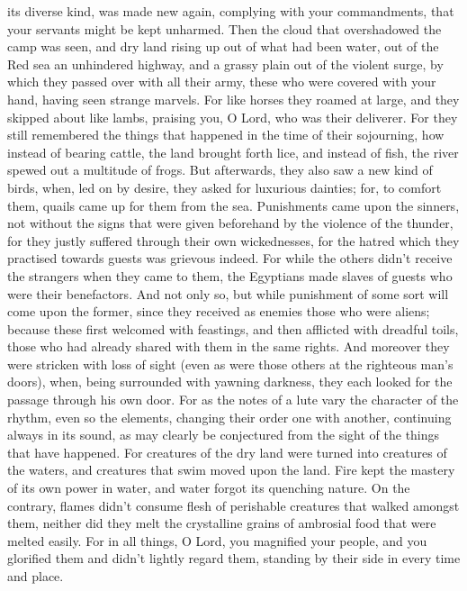 its diverse kind, was made new again, complying with your commandments,
that your servants might be kept unharmed.  Then the cloud
that overshadowed the camp was seen, and dry land rising up out of what
had been water, out of the Red sea an unhindered highway, and a grassy
plain out of the violent surge,  by which they passed over
with all their army, these who were covered with your hand, having seen
strange marvels.  For like horses they roamed at large, and
they skipped about like lambs, praising you, O Lord, who was their
deliverer.  For they still remembered the things that
happened in the time of their sojourning, how instead of bearing cattle,
the land brought forth lice, and instead of fish, the river spewed out a
multitude of frogs.  But afterwards, they also saw a new
kind of birds, when, led on by desire, they asked for luxurious
dainties;  for, to comfort them, quails came up for them
from the sea.  Punishments came upon the sinners, not
without the signs that were given beforehand by the violence of the
thunder, for they justly suffered through their own wickednesses, for
the hatred which they practised towards guests was grievous indeed.
 For while the others didn't receive the strangers when
they came to them, the Egyptians made slaves of guests who were their
benefactors.  And not only so, but while punishment of some
sort will come upon the former, since they received as enemies those who
were aliens;  because these first welcomed with feastings,
and then afflicted with dreadful toils, those who had already shared
with them in the same rights.  And moreover they were
stricken with loss of sight (even as were those others at the righteous
man's doors), when, being surrounded with yawning darkness, they each
looked for the passage through his own door.  For as the
notes of a lute vary the character of the rhythm, even so the elements,
changing their order one with another, continuing always in its sound,
as may clearly be conjectured from the sight of the things that have
happened.  For creatures of the dry land were turned into
creatures of the waters, and creatures that swim moved upon the land.
 Fire kept the mastery of its own power in water, and water
forgot its quenching nature.  On the contrary, flames
didn't consume flesh of perishable creatures that walked amongst them,
neither did they melt the crystalline grains of ambrosial food that were
melted easily.  For in all things, O Lord, you magnified
your people, and you glorified them and didn't lightly regard them,
standing by their side in every time and place.
